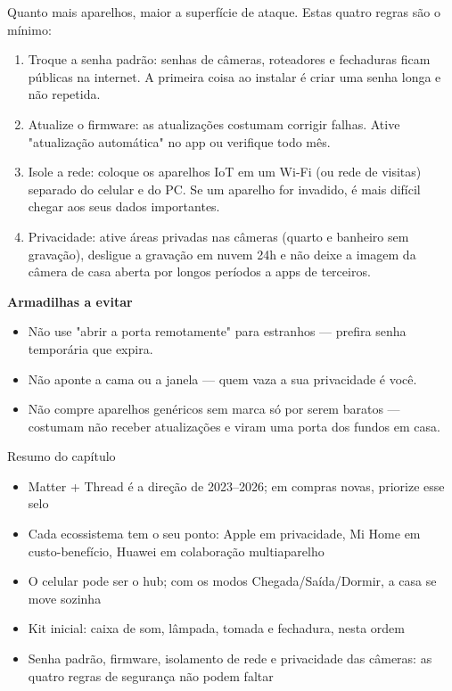 
Quanto mais aparelhos, maior a superfície de ataque. Estas quatro regras são o mínimo:

\begin{enumerate}
  \item Troque a senha padrão: senhas de câmeras, roteadores e fechaduras ficam públicas na internet. A primeira coisa ao instalar é criar uma senha longa e não repetida.
  \item Atualize o firmware: as atualizações costumam corrigir falhas. Ative "atualização automática" no app ou verifique todo mês.
  \item Isole a rede: coloque os aparelhos IoT em um Wi-Fi (ou rede de visitas) separado do celular e do PC. Se um aparelho for invadido, é mais difícil chegar aos seus dados importantes.
  \item Privacidade: ative áreas privadas nas câmeras (quarto e banheiro sem gravação), desligue a gravação em nuvem 24h e não deixe a imagem da câmera de casa aberta por longos períodos a apps de terceiros.
\end{enumerate}

\textbf{Armadilhas a evitar}\par

\begin{itemize}
  \item Não use "abrir a porta remotamente" para estranhos — prefira senha temporária que expira.
  \item Não aponte a cama ou a janela — quem vaza a sua privacidade é você.
  \item Não compre aparelhos genéricos sem marca só por serem baratos — costumam não receber atualizações e viram uma porta dos fundos em casa.
\end{itemize}

\begin{tcbsummary}{Resumo do capítulo}
\begin{itemize}
  \item Matter + Thread é a direção de 2023–2026; em compras novas, priorize esse selo
  \item Cada ecossistema tem o seu ponto: Apple em privacidade, Mi Home em custo-benefício, Huawei em colaboração multiaparelho
  \item O celular pode ser o hub; com os modos Chegada/Saída/Dormir, a casa se move sozinha
  \item Kit inicial: caixa de som, lâmpada, tomada e fechadura, nesta ordem
  \item Senha padrão, firmware, isolamento de rede e privacidade das câmeras: as quatro regras de segurança não podem faltar
\end{itemize}

\end{tcbsummary}

